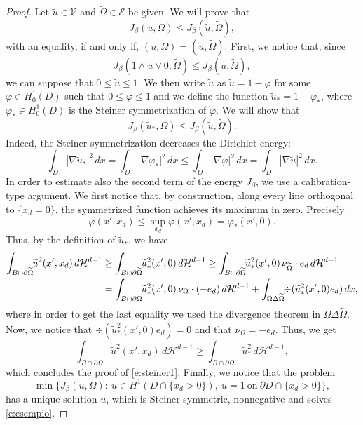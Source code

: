 \documentclass[JEP,XML,SOM,Unicode]{cedram}
\theoremstyle{plain}
\theoremstyle{definition}
\def\HH{\mathcal{H}}
\begin{document}
\begin{proof}
Let $\widetilde u\in \mathcal V$ and $\widetilde\Omega\in \mathcal E$ be given. We will prove that
\[J_\beta(u,\Omega)\le J_\beta(\widetilde u,\widetilde\Omega),\]
with an equality, if and only if, $(u,\Omega)=(\widetilde u,\widetilde\Omega)$. First, we notice that, since
\[
J_\beta(1\wedge\widetilde u\vee0,\widetilde\Omega)\le J_\beta(\widetilde u,\widetilde\Omega),
\]
we can suppose that $0\le \widetilde u\le 1$. We then write $\widetilde u$ as $\widetilde u=1-\varphi$ for some $\varphi\in H^1_0(D)$ such that $0\le \varphi\le 1$ and we define the function $\widetilde u_\ast=1-\varphi_\ast$, where $\varphi_\ast\in H^1_0(D)$ is the Steiner symmetrization of $\varphi$. We will show that
\begin{equation}\label{e:steiner1}
J_\beta(\widetilde u_\ast,\Omega)\le J_\beta(\widetilde u,\widetilde\Omega).
\end{equation}
Indeed, the Steiner symmetrization decreases the Dirichlet energy:
\[\int_D|\nabla \widetilde u_\ast|^2\,dx=\int_D|\nabla \varphi_\ast|^2\,dx\le \int_D|\nabla \varphi|^2\,dx=\int_D|\nabla \widetilde u|^2\,dx.\]
In order to estimate also the second term of the energy $J_\beta$, we use a calibration-type argument.
We first notice that, by construction, along every line orthogonal to $\{x_d=0\}$, the symmetrized function achieves its maximum in zero. Precisely
\[\varphi(x',x_d)\le \sup_{x_d}\varphi(x',x_d)=\varphi_\ast(x',0).\]
Thus, by the definition of $\widetilde u_\ast$, we have
\begin{align*}
\int_{B\cap\partial\widetilde\Omega}\hspace*{-1mm}\widetilde u^2(x',x_d)\,d\HH^{d-1}&\ge \int_{B\cap\partial\widetilde \Omega}\hspace*{-1mm}\widetilde u_\ast^2(x',0)\,d\HH^{d-1}\ge \int_{B\cap\partial\widetilde\Omega}\hspace*{-1mm}\widetilde u_\ast^2(x',0)\,\nu_{\widetilde\Omega}\cdot e_d\,d\HH^{d-1}\\
&= \int_{B\cap\partial\Omega}\hspace*{-1mm}\widetilde u_\ast^2(x',0)\, \nu_{\Omega}\cdot(-e_d)\,d\HH^{d-1}+\int_{\Omega\Delta\widetilde\Omega}\hspace*{-1mm}\div(\widetilde u_\ast^2(x',0)e_d)\,dx,
\end{align*}
where in order to get the last equality we used the divergence theorem in $\Omega\Delta\widetilde\Omega$. Now, we notice that $\div(\widetilde u_\ast^2(x',0)e_d)=0$ and that $\nu_\Omega=-e_d$.
Thus, we get
\[\int_{B\cap\partial\widetilde\Omega}\widetilde u^2(x',x_d)\,d\HH^{d-1}\ge \int_{B\cap\partial\Omega}\widetilde u_\ast^2\,d\HH^{d-1},\]
which concludes the proof of \eqref{e:steiner1}. Finally, we notice that the problem
\begin{equation*}
\min\big\{J_\beta(u,\Omega):\ u\in H^1(D\cap \{x_d>0\}),\ u=1\ \text{on}\ \partial D\cap\{x_d>0\}\big\},
\end{equation*}
has a unique solution $u$, which is Steiner symmetric, nonnegative and solves \eqref{e:esempio}.
\end{proof}

\backmatter


\end{document}
